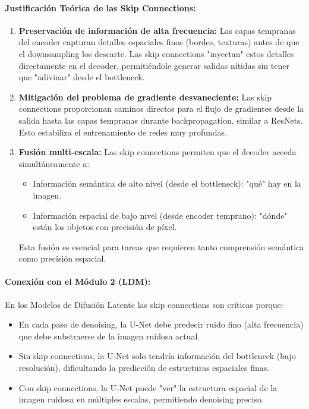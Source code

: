 \documentclass{article}
\begin{document}
\paragraph{Justificación Teórica de las Skip Connections:}
\begin{enumerate}
    \item \textbf{Preservación de información de alta frecuencia:} Las capas tempranas del encoder capturan detalles espaciales finos (bordes, texturas) antes de que el downsampling los descarte. Las skip connections "inyectan" estos detalles directamente en el decoder, permitiéndole generar salidas nítidas sin tener que "adivinar" desde el bottleneck.
    
    \item \textbf{Mitigación del problema de gradiente desvaneciente:} Las skip connections proporcionan caminos directos para el flujo de gradientes desde la salida hasta las capas tempranas durante backpropagation, similar a ResNets. Esto estabiliza el entrenamiento de redes muy profundas.
    
    \item \textbf{Fusión multi-escala:} Las skip connections permiten que el decoder acceda simultáneamente a:
    \begin{itemize}
        \item Información semántica de alto nivel (desde el bottleneck): "qué" hay en la imagen.
        \item Información espacial de bajo nivel (desde encoder temprano): "dónde" están los objetos con precisión de píxel.
    \end{itemize}
    Esta fusión es esencial para tareas que requieren tanto comprensión semántica como precisión espacial.
\end{enumerate}

\paragraph{Conexión con el Módulo 2 (LDM):}
En los Modelos de Difusión Latente las skip connections son críticas porque:
\begin{itemize}
    \item En cada paso de denoising, la U-Net debe predecir ruido fino (alta frecuencia) que debe substraerse de la imagen ruidosa actual.
    \item Sin skip connections, la U-Net solo tendría información del bottleneck (bajo resolución), dificultando la predicción de estructuras espaciales finas.
    \item Con skip connections, la U-Net puede "ver" la estructura espacial de la imagen ruidosa en múltiples escalas, permitiendo denoising preciso.
\end{itemize}
\end{document}
